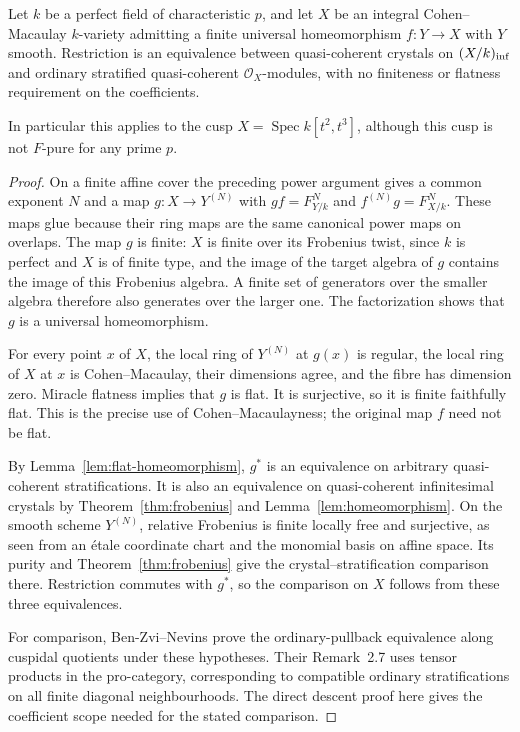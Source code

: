\documentclass[11pt]{article}
\newcommand{\OO}{\mathcal O}\newcommand{\Fp}{\mathbf F_p}
\DeclareMathOperator{\Spec}{Spec}\DeclareMathOperator{\Hom}{Hom}
\theoremstyle{definition}\newtheorem{definition}[theorem]{Definition}
\theoremstyle{remark}\newtheorem{remark}[theorem]{Remark}
\begin{document}
\begin{proposition}\label{cor:cusps}
Let $k$ be a perfect field of characteristic $p$, and let $X$ be an integral Cohen--Macaulay $k$-variety admitting a finite universal homeomorphism $f:Y\to X$ with $Y$ smooth.  Restriction is an equivalence between quasi-coherent crystals on $(X/k)_{\rm inf}$ and ordinary stratified quasi-coherent $\OO_X$-modules, with no finiteness or flatness requirement on the coefficients.

In particular this applies to the cusp $X=\Spec k[t^2,t^3]$, although this cusp is not $F$-pure for any prime $p$.
\end{proposition}
\begin{proof}
On a finite affine cover the preceding power argument gives a common exponent $N$ and a map $g:X\to Y^{(N)}$ with $gf=F_{Y/k}^N$ and $f^{(N)}g=F_{X/k}^N$. These maps glue because their ring maps are the same canonical power maps on overlaps. The map $g$ is finite: $X$ is finite over its Frobenius twist, since $k$ is perfect and $X$ is of finite type, and the image of the target algebra of $g$ contains the image of this Frobenius algebra. A finite set of generators over the smaller algebra therefore also generates over the larger one. The factorization shows that $g$ is a universal homeomorphism.

For every point $x$ of $X$, the local ring of $Y^{(N)}$ at $g(x)$ is regular, the local ring of $X$ at $x$ is Cohen--Macaulay, their dimensions agree, and the fibre has dimension zero. Miracle flatness \cite[Tag~00R4]{StacksProject} implies that $g$ is flat. It is surjective, so it is finite faithfully flat. This is the precise use of Cohen--Macaulayness; the original map $f$ need not be flat.

By Lemma~\ref{lem:flat-homeomorphism}, $g^*$ is an equivalence on arbitrary quasi-coherent stratifications. It is also an equivalence on quasi-coherent infinitesimal crystals by Theorem~\ref{thm:frobenius} and Lemma~\ref{lem:homeomorphism}. On the smooth scheme $Y^{(N)}$, relative Frobenius is finite locally free and surjective, as seen from an \'etale coordinate chart and the monomial basis on affine space. Its purity and Theorem~\ref{thm:frobenius} give the crystal--stratification comparison there. Restriction commutes with $g^*$, so the comparison on $X$ follows from these three equivalences.

For comparison, Ben-Zvi--Nevins \cite[Proposition~2.11, Theorems~3.11 and~4.3, Remark~4.5]{BenZviNevins} prove the ordinary-pullback equivalence along cuspidal quotients under these hypotheses. Their Remark~2.7 uses tensor products in the pro-category, corresponding to compatible ordinary stratifications on all finite diagonal neighbourhoods. The direct descent proof here gives the coefficient scope needed for the stated comparison.


\end{proof}
\end{document}
